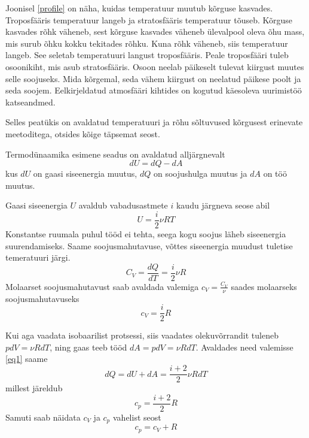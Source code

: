 \documentclass{trkut}%
\begin{document}
Joonisel \ref{profile} on näha, kuidas temperatuur muutub kõrguse kasvades. Troposfääris temperatuur langeb ja stratosfääris temperatuur tõuseb. Kõrguse kasvades rõhk väheneb, sest kõrguse kasvades väheneb ülevalpool oleva õhu mass, mis surub õhku kokku tekitades rõhku. Kuna rõhk väheneb, siis temperatuur langeb. See seletab temperatuuri langust troposfääris. Peale troposfääri tuleb osoonikiht, mis asub stratosfääris. Osoon neelab päikeselt tulevat kiirgust muutes selle soojuseks. Mida kõrgemal, seda vähem kiirgust on neelatud päikese poolt ja seda soojem. Eelkirjeldatud atmosfääri kihtides on kogutud käesoleva uurimistöö katseandmed.

Selles peatükis on avaldatud temperatuuri ja rõhu sõltuvused kõrgusest erinevate meetoditega, otsides kõige täpsemat seost.

Termodünaamika esimene seadus on avaldatud alljärgnevalt
\begin{equation}\label{eq1}
dU = dQ - dA
\end{equation}
kus $dU$ on gaasi siseenergia muutus, $dQ$ on soojushulga muutus ja $dA$ on töö muutus.

Gaasi siseenergia $U$ avaldub vabadusastmete $i$ kaudu järgneva seose abil
\begin{equation}\label{eq5}
U = \frac{i}{2} \nu R T
\end{equation}
Konstantse ruumala puhul tööd ei tehta, seega kogu soojus läheb siseenergia suurendamiseks. Saame soojusmahutavuse, võttes siseenergia muudust tuletise temeratuuri järgi.
\begin{equation}\label{eq6}
C_V = \frac{dQ}{dT}=\frac{i}{2}\nu R
\end{equation}
Molaarset soojusmahutavust saab avaldada valemiga $c_V = \frac{C_V}{\nu}$ saades molaarseks soojusmahutavuseks
\begin{equation}\label{eq7}
c_V = \frac{i}{2}R
\end{equation}

Kui aga vaadata isobaarilist protsessi, siis vaadates olekuvõrrandit tuleneb $pdV=\nu RdT$, ning gaas teeb tööd $dA = pdV = \nu RdT$. Avaldades need valemisse \ref{eq1} saame
\begin{equation*}
dQ = dU + dA = \frac{i+2}{2} \nu R dT
\end{equation*}
millest järeldub
\begin{equation*}
c_p=\frac{i+2}{2}R
\end{equation*}
Samuti saab näidata $c_V$ ja $c_p$ vahelist seost
\begin{equation}\label{eq9}
c_p = c_V + R
\end{equation}
\end{document}
